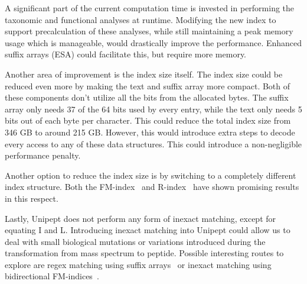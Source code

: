 \documentclass[11pt]{article}
\begin{document}
\begin{multicols}{2}
        A significant part of the current computation time is invested in performing the taxonomic and functional analyses at runtime.
        Modifying the new index to support precalculation of these analyses, while still maintaining a peak memory usage which is manageable, would drastically improve the performance.
        Enhanced suffix arrays (ESA) could facilitate this, but require more memory.

        Another area of improvement is the index size itself.
        The index size could be reduced even more by making the text and suffix array more compact.
        Both of these components don't utilize all the bits from the allocated bytes.
        The suffix array only needs 37 of the 64 bits used by every entry, while the text only needs 5 bits out of each byte per character.
        This could reduce the total index size from 346 GB to around 215 GB\@.
        However, this would introduce extra steps to decode every access to any of these data structures.
        This could introduce a non-negligible performance penalty.

        Another option to reduce the index size is by switching to a completely different index structure.
        Both the FM-index~\cite{fm_index} and R-index~\cite{r_index} have shown promising results in this respect.

        Lastly, Unipept does not perform any form of inexact matching, except for equating I and L\@.
        Introducing inexact matching into Unipept could allow us to deal with small biological mutations or variations introduced during the transformation from mass spectrum to peptide.
        Possible interesting routes to explore are regex matching using suffix arrays~\cite{regex_sa} or inexact matching using bidirectional FM-indices~\cite{bi-directional_fm_index}.
        \printbibliography
    \end{multicols}
\end{document}
